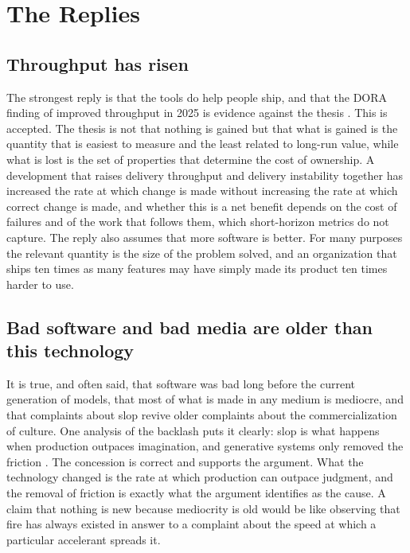 \documentclass[11pt,a4paper]{article}
\theoremstyle{remark}
\begin{document}
\section{The Replies}

\subsection{Throughput has risen}

The strongest reply is that the tools do help people ship, and that the DORA finding of improved throughput in 2025 is evidence against the thesis \cite{DORA2025}. This is accepted. The thesis is not that nothing is gained but that what is gained is the quantity that is easiest to measure and the least related to long-run value, while what is lost is the set of properties that determine the cost of ownership. A development that raises delivery throughput and delivery instability together has increased the rate at which change is made without increasing the rate at which correct change is made, and whether this is a net benefit depends on the cost of failures and of the work that follows them, which short-horizon metrics do not capture. The reply also assumes that more software is better. For many purposes the relevant quantity is the size of the problem solved, and an organization that ships ten times as many features may have simply made its product ten times harder to use.

\subsection{Bad software and bad media are older than this technology}

It is true, and often said, that software was bad long before the current generation of models, that most of what is made in any medium is mediocre, and that complaints about slop revive older complaints about the commercialization of culture. One analysis of the backlash puts it clearly: slop is what happens when production outpaces imagination, and generative systems only removed the friction \cite{ListenFirst2026}. The concession is correct and supports the argument. What the technology changed is the rate at which production can outpace judgment, and the removal of friction is exactly what the argument identifies as the cause. A claim that nothing is new because mediocrity is old would be like observing that fire has always existed in answer to a complaint about the speed at which a particular accelerant spreads it.
\end{document}
